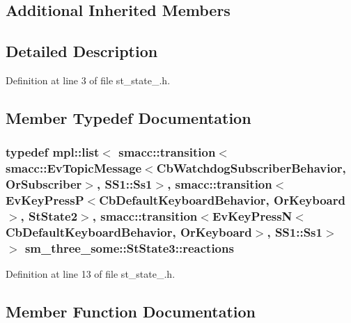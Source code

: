 \subsection*{Additional Inherited Members}


\subsection{Detailed Description}


Definition at line 3 of file st\+\_\+state\+\_.\+h.



\subsection{Member Typedef Documentation}
\subsubsection[{\texorpdfstring{reactions}{reactions}}]{\setlength{\rightskip}{0pt plus 5cm}typedef mpl\+::list$<$ {\bf smacc\+::transition}$<${\bf smacc\+::\+Ev\+Topic\+Message}$<${\bf Cb\+Watchdog\+Subscriber\+Behavior}, {\bf Or\+Subscriber}$>$, {\bf S\+S1\+::\+Ss1}$>$, {\bf smacc\+::transition}$<${\bf Ev\+Key\+PressP}$<${\bf Cb\+Default\+Keyboard\+Behavior}, {\bf Or\+Keyboard}$>$, {\bf St\+State2}$>$, {\bf smacc\+::transition}$<${\bf Ev\+Key\+PressN}$<${\bf Cb\+Default\+Keyboard\+Behavior}, {\bf Or\+Keyboard}$>$, {\bf S\+S1\+::\+Ss1}$>$ $>$ {\bf sm\+\_\+three\+\_\+some\+::\+St\+State3\+::reactions}}\hypertarget{structsm__three__some_1_1StState3_a4136eb83635553c4ccc8ab0ca217a8f2}{}\label{structsm__three__some_1_1StState3_a4136eb83635553c4ccc8ab0ca217a8f2}


Definition at line 13 of file st\+\_\+state\+\_.\+h.



\subsection{Member Function Documentation}
